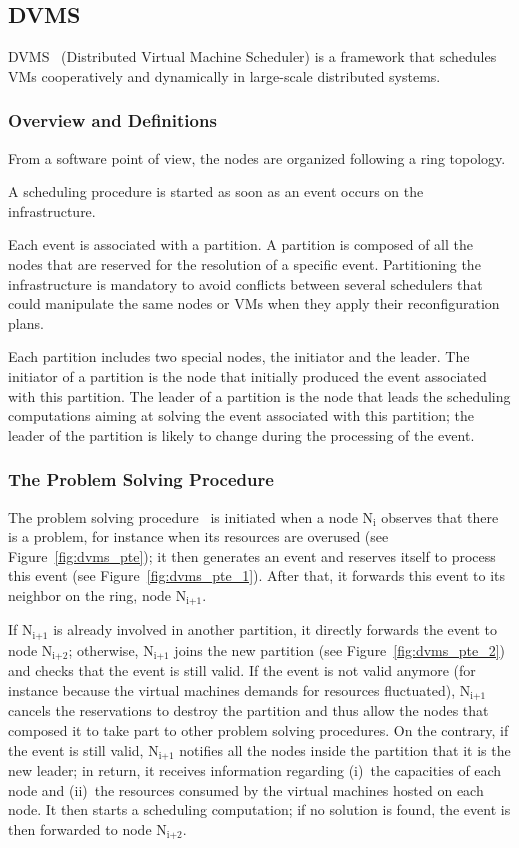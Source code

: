 \subsection{DVMS}

DVMS~\cite{quesnel:ispa2013,quesnel:cpe2012} (Distributed Virtual Machine
Scheduler) is a framework that schedules VMs cooperatively and dynamically in
large-scale distributed systems.

\subsubsection{Overview and Definitions}
From a software point of view, the nodes are organized following a ring
topology.

A scheduling procedure is started as soon
as an event occurs on the infrastructure.

Each event is associated with a partition.  A partition is composed of all the
nodes that are reserved for the resolution of a specific event.
%
Partitioning the infrastructure is mandatory to avoid conflicts between several
schedulers that could manipulate the same nodes or VMs when they apply their
reconfiguration plans.

Each partition includes two special nodes, the initiator and the leader.
The initiator of a partition is the node that
initially produced the event associated with this partition.
The leader of a partition is the node that leads the scheduling computations
aiming at solving the event associated with this partition; the leader of
the partition is likely to change during the processing of the event.


\subsubsection{The Problem Solving Procedure}

The problem solving procedure~\cite{quesnel:vhpc11} is initiated when a node
N\(_{\text{i}}\) observes that there is a problem, for instance when its
resources are overused (see Figure~\ref{fig:dvms_pte}); it then generates an
event and reserves itself to process this event (see
Figure~\ref{fig:dvms_pte_1}).  After that, it forwards this event to its
neighbor on the ring, node N\(_{\text{i+1}}\).

If N\(_{\text{i+1}}\) is already involved in another partition, it directly
forwards the event to node N\(_{\text{i+2}}\); otherwise, N\(_{\text{i+1}}\)
joins the new partition (see Figure~\ref{fig:dvms_pte_2}) and checks that the
event is still valid.  If the event is not valid anymore (for instance because
the virtual machines demands for resources fluctuated), N\(_{\text{i+1}}\)
cancels the reservations to destroy the partition and thus allow the nodes that
composed it to take part to other problem solving procedures.
%
On the contrary, if the event is still valid, N\(_{\text{i+1}}\) notifies all
the nodes inside the partition that it is the new leader; in return, it receives
information regarding (i)~the capacities of each node and (ii)~the resources
consumed by the virtual machines hosted on each node.  It then starts a
scheduling computation; if no solution is found, the event is then forwarded to
node N\(_{\text{i+2}}\).


